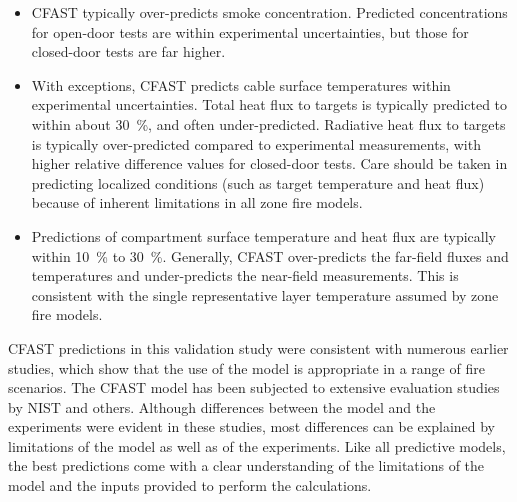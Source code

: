 \begin{itemize}
\item CFAST typically over-predicts smoke concentration.  Predicted concentrations for open-door tests are within experimental uncertainties, but those for closed-door tests are far higher.
\item With exceptions, CFAST predicts cable surface temperatures within experimental uncertainties.  Total heat flux to targets is typically predicted to within about 30~\%, and often under-predicted.  Radiative heat flux to targets is typically over-predicted compared to experimental measurements, with higher relative difference values for closed-door tests.  Care should be taken in predicting localized conditions (such as target temperature and heat flux) because of inherent limitations in all zone fire models.
\item Predictions of compartment surface temperature and heat flux are typically within 10~\% to 30~\%.  Generally, CFAST over-predicts the far-field fluxes and temperatures and under-predicts the near-field measurements.  This is consistent with the single representative layer temperature assumed by zone fire models.
\end{itemize}

CFAST predictions in this validation study were consistent with numerous earlier studies, which show that the use of the model is appropriate in a range of fire scenarios.  The CFAST model has been subjected to extensive evaluation studies by NIST and others.  Although differences between the model and the experiments were evident in these studies, most differences can be explained by limitations of the model as well as of the experiments.  Like all predictive models, the best predictions come with a clear understanding of the limitations of the model and the inputs provided to perform the calculations.